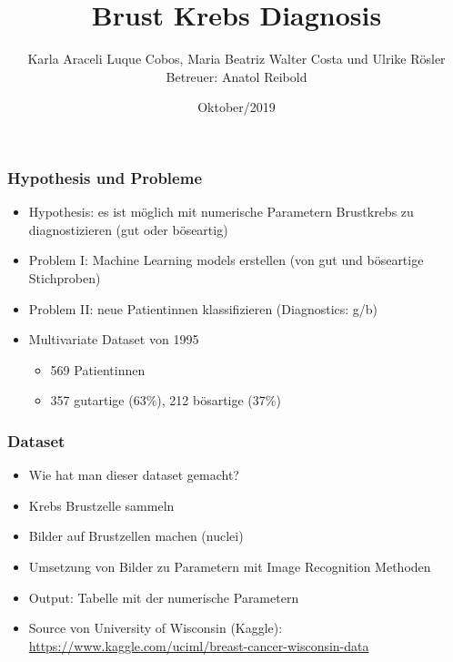 \documentclass{beamer}
\title{Brust Krebs Diagnosis}
\author[]{Karla Araceli Luque Cobos, Maria Beatriz Walter Costa und Ulrike R\"osler \\ Betreuer: Anatol Reibold}
\institute{Big Data Analytics (alphatraining)}
\date{Oktober/2019}
\begin{document}
 
    \frame{\titlepage}

    \begin{frame}
    \frametitle{Hypothesis und Probleme}

    \begin{itemize}
    \item Hypothesis: es ist m\"oglich mit numerische Parametern Brustkrebs zu diagnostizieren (gut oder b\"oseartig)
    \item Problem I: Machine Learning models erstellen (von gut und b\"oseartige Stichproben)
    \item Problem II: neue Patientinnen klassifizieren (Diagnostics: g/b)
    \item Multivariate Dataset von 1995
            \begin{itemize}
            \item 569 Patientinnen
            \item 357 gutartige (63\%), 212 b\"osartige (37\%)
            \end{itemize}
    \end{itemize}
    \end{frame}
    
    \begin{frame}
    \frametitle{Dataset}

    \begin{itemize}
    \item Wie hat man dieser dataset gemacht?
    \item Krebs Brustzelle sammeln 
    \item Bilder auf Brustzellen machen (nuclei)
    \item Umsetzung von Bilder zu Parametern mit Image Recognition Methoden
    \item Output: Tabelle mit der numerische Parametern
    \item Source von University of Wisconsin (Kaggle): \url{https://www.kaggle.com/uciml/breast-cancer-wisconsin-data} 
    \end{itemize}
    \end{frame}
\end{document}
